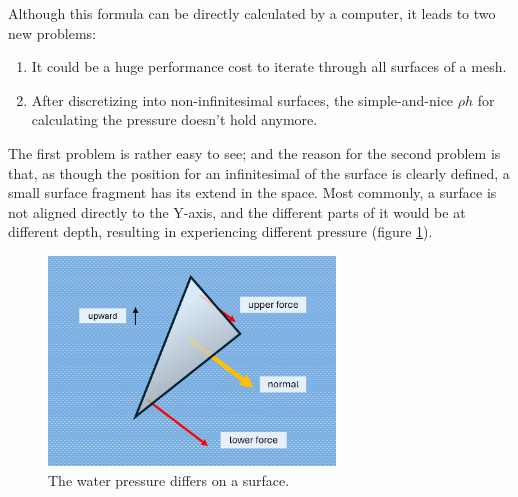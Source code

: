 Although this formula can be directly calculated by a computer, it leads to two new problems:
\begin{enumerate}
	\item It could be a huge performance cost to iterate through all surfaces of a mesh.
	\item After discretizing into non-infinitesimal surfaces, the simple-and-nice $\rho h$ for calculating the pressure doesn't hold anymore.
\end{enumerate}

The first problem is rather easy to see;
and the reason for the second problem is that, as though the position for an infinitesimal of the surface is clearly defined, a small surface fragment has its extend in the space.
Most commonly, a surface is not aligned directly to the Y-axis, and the different parts of it would be at different depth, resulting in experiencing different pressure (figure \ref{water-pressure-differs-on-surface}).

\begin{figure}[h]
	\begin{center}
		\includegraphics[width=3in]{figures/water-pressure-on-small-surface.png}
	\end{center}
	\caption{The water pressure differs on a surface.}
	\label{water-pressure-differs-on-surface}
\end{figure}